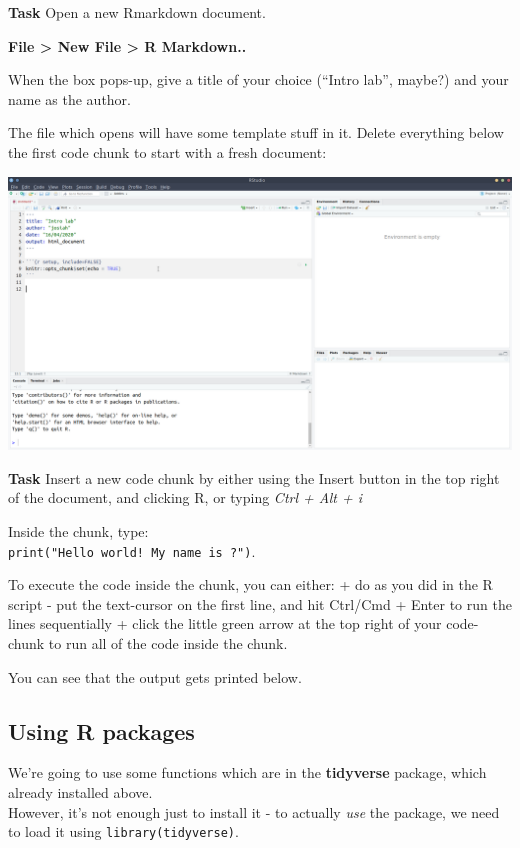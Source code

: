 \documentclass[]{book}
\begin{document}
\textbf{Task}
Open a new Rmarkdown document.

\textbf{File \textgreater{} New File \textgreater{} R Markdown..}

When the box pops-up, give a title of your choice (``Intro lab'', maybe?) and your name as the author.

The file which opens will have some template stuff in it. Delete everything below the first code chunk to start with a fresh document:

\includegraphics{images/installing_intro/ss_newrmd.png}

\textbf{Task}
Insert a new code chunk by either using the Insert button in the top right of the document, and clicking R, or typing \emph{Ctrl + Alt + i}

Inside the chunk, type:\\
\texttt{print("Hello\ world!\ My\ name\ is\ ?")}.

To execute the code inside the chunk, you can either:
+ do as you did in the R script - put the text-cursor on the first line, and hit Ctrl/Cmd + Enter to run the lines sequentially
+ click the little green arrow at the top right of your code-chunk to run all of the code inside the chunk.

You can see that the output gets printed below.

\hypertarget{using-r-packages}{%
\subsection*{Using R packages}\label{using-r-packages}}

We're going to use some functions which are in the \textbf{tidyverse} package, which already installed above.\\
However, it's not enough just to install it - to actually \emph{use} the package, we need to load it using \texttt{library(tidyverse)}.
\end{document}
